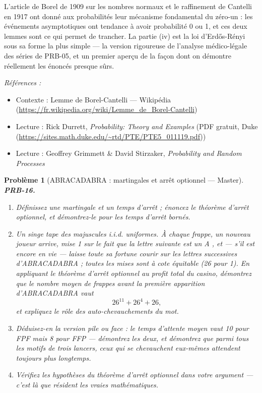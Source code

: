 \documentclass[11pt]{article}
\newtheorem{problem}{Problème}
\newenvironment{refs}{\par\small\noindent\emph{Références :}\begin{itemize}\setlength\itemsep{0pt}}{\end{itemize}\normalsize}
\begin{document}
\noindent L'article de Borel de 1909 sur les nombres normaux et le raffinement de
Cantelli en 1917 ont donné aux probabilités leur mécanisme fondamental du zéro-un : les événements
asymptotiques ont tendance à avoir probabilité 0 ou 1, et ces deux lemmes sont ce qui permet de
trancher. La partie (iv) est la loi d'Erd\H{o}s-Rényi sous sa forme la plus simple --- la version
rigoureuse de l'analyse médico-légale des séries de PRB-05, et un premier aperçu de la façon dont
on démontre réellement les énoncés presque sûrs.

\begin{refs}
\item Contexte : Lemme de Borel-Cantelli --- Wikipédia (\url{https://fr.wikipedia.org/wiki/Lemme_de_Borel-Cantelli})
\item Lecture : Rick Durrett, \textit{Probability: Theory and Examples} (PDF gratuit, Duke (\url{https://sites.math.duke.edu/~rtd/PTE/PTE5_011119.pdf}))
\item Lecture : Geoffrey Grimmett \& David Stirzaker, \textit{Probability and Random Processes}
\end{refs}

\bigskip

\begin{problem}[{ABRACADABRA : martingales et arrêt optionnel --- Master}]
\textbf{PRB-16.} \begin{enumerate}
\item[(i)] Définissez une martingale et un temps d'arrêt ; énoncez le théorème d'arrêt optionnel, et
démontrez-le pour les temps d'arrêt bornés.
\item[(ii)] Un singe tape des majuscules i.i.d. uniformes. À chaque frappe, un nouveau joueur arrive, mise
1 sur le fait que la lettre suivante est un \og{} A \fg{}, et --- s'il est encore en vie --- laisse toute sa
fortune courir sur les lettres successives d'ABRACADABRA ; toutes les mises sont à cote équitable
(26 pour 1). En appliquant le théorème d'arrêt optionnel au profit total du casino, démontrez que
le nombre moyen de frappes avant la première apparition d'ABRACADABRA vaut
\[ 26^{11} + 26^4 + 26 , \]
et expliquez le rôle des auto-chevauchements du mot.
\item[(iii)] Déduisez-en la version pile ou face : le temps d'attente moyen vaut 10 pour FPF mais 8 pour
FFP --- démontrez les deux, et démontrez que parmi tous les motifs de trois lancers, ceux qui se
chevauchent eux-mêmes attendent toujours plus longtemps.
\item[(iv)] Vérifiez les hypothèses du théorème d'arrêt optionnel dans votre argument --- c'est là que
résident les vraies mathématiques.
\end{enumerate}

\end{problem}
\end{document}
